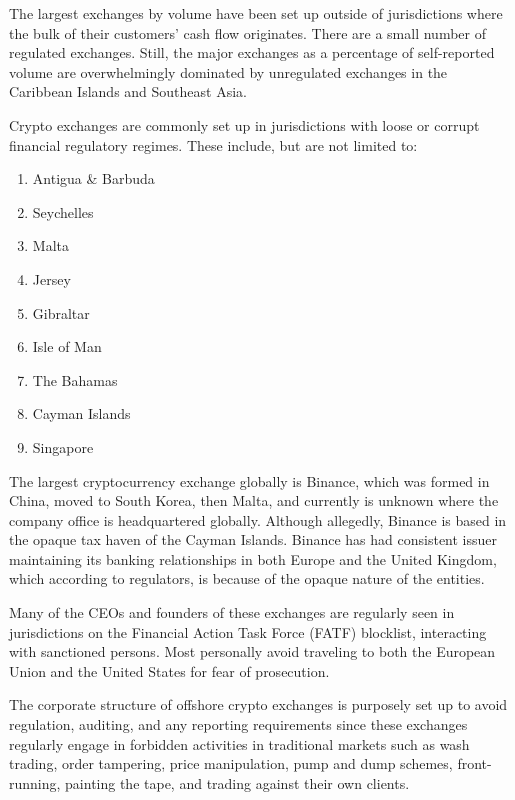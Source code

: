 
The largest exchanges by volume have been set up outside of jurisdictions where
the bulk of their customers' cash flow originates. There are a small number of
regulated exchanges. Still, the major exchanges as a percentage of self-reported
volume are overwhelmingly dominated by unregulated exchanges in the Caribbean
Islands and Southeast Asia.

Crypto exchanges are commonly set up in jurisdictions with loose or corrupt
financial regulatory regimes. These include, but are not limited to:

\begin{enumerate}
\item Antigua \& Barbuda
\item Seychelles
\item Malta
\item Jersey
\item Gibraltar
\item Isle of Man
\item The Bahamas
\item Cayman Islands
\item Singapore
\end{enumerate}

The largest cryptocurrency exchange globally is Binance, which was formed in
China, moved to South Korea, then Malta, and currently is unknown where the
company office is headquartered globally. Although allegedly, Binance is based
in the opaque tax haven of the Cayman Islands. Binance has had consistent issuer
maintaining its banking relationships in both Europe and the United Kingdom,
which according to regulators, is because of the opaque nature of the entities.
\cite{feinstein_impact_2020}


Many of the CEOs and founders of these exchanges are regularly seen in
jurisdictions on the Financial Action Task Force (FATF) blocklist, interacting
with sanctioned persons. Most personally avoid traveling to both the European
Union and the United States for fear of prosecution.

The corporate structure of offshore crypto exchanges is purposely set up to
avoid regulation, auditing, and any reporting requirements since these exchanges
regularly engage in forbidden activities in traditional markets such as wash
trading, order tampering, price manipulation, pump and dump schemes,
front-running, painting the tape, and trading against their own clients.
\cite{feinstein_impact_2020}

